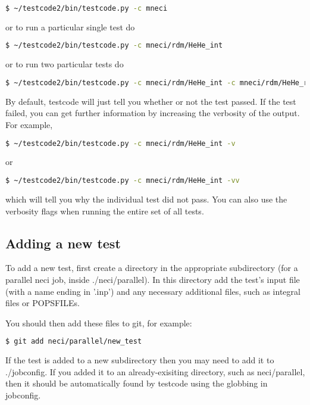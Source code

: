 \documentclass[a4paper,notitlepage]{scrreprt}
\begin{document}
{{{\begin{lstlisting}[language=bash]
    $ ~/testcode2/bin/testcode.py -c mneci
\end{lstlisting}

or to run a particular single test do

\begin{lstlisting}[language=bash]
    $ ~/testcode2/bin/testcode.py -c mneci/rdm/HeHe_int
\end{lstlisting}

or to run two particular tests do

\begin{lstlisting}[language=bash]
    $ ~/testcode2/bin/testcode.py -c mneci/rdm/HeHe_int -c mneci/rdm/HeHe_real
\end{lstlisting}

By default, testcode will just tell you whether or not the test passed.
If the test failed, you can get further information by increasing the
verbosity of the output. For example,

\begin{lstlisting}[language=bash]
    $ ~/testcode2/bin/testcode.py -c mneci/rdm/HeHe_int -v
\end{lstlisting}

or

\begin{lstlisting}[language=bash]
    $ ~/testcode2/bin/testcode.py -c mneci/rdm/HeHe_int -vv
\end{lstlisting}

which will tell you why the individual test did not pass. You can also
use the verbosity flags when running the entire set of all tests.

\subsection{Adding a new test}
To add a new test, first create a directory in the appropriate subdirectory
(for a parallel neci job, inside ./neci/parallel). In this directory add the
test's input file (with a name ending in '.inp') and any necessary additional
files, such as integral files or POPSFILEs.

You should then add these files to git, for example:

\begin{lstlisting}[language=bash]
    $ git add neci/parallel/new_test
\end{lstlisting}

If the test is added to a new subdirectory then you may need to add it to
./jobconfig. If you added it to an already-exisiting directory, such as
neci/parallel, then it should be automatically found by testcode using the
globbing in jobconfig.

}}}
\end{document}
